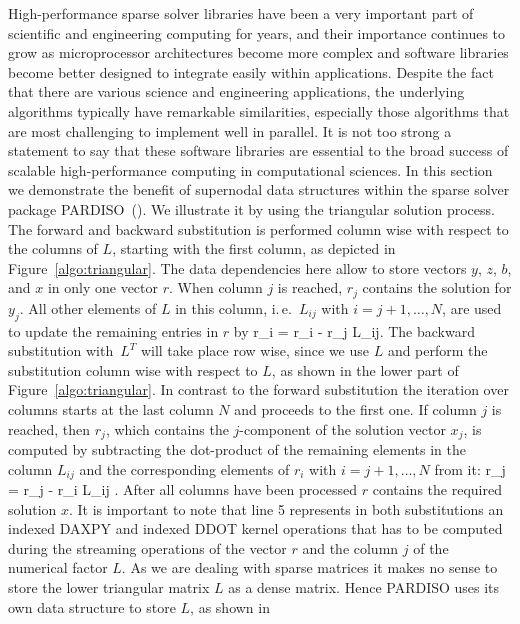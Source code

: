 High-performance sparse solver libraries have been a very important part of
scientific and engineering computing for years, and their importance
continues to grow as microprocessor architectures become more complex
and software libraries become better designed to integrate easily
within applications. Despite the fact that there are various science
and engineering applications, the underlying algorithms typically have
remarkable similarities, especially those algorithms that are most
challenging to implement well in parallel. It is not too strong a
statement to say that these software libraries are essential to the
broad success of scalable high-performance computing in computational
sciences.  In this section we demonstrate the benefit of supernodal data structures within the 
sparse solver package PARDISO~(\cite{schenk-2004,Bollhofer2020}). We illustrate it by using
the triangular solution process. The forward and backward substitution is performed
column wise with respect to the columns of $L$, starting with the
first column, as depicted in Figure~\ref{algo:triangular}.
The data dependencies here allow to store vectors $y$, $z$, $b$, and $x$ in only one
vector $r$. When column $j$ is reached, $r_j$ contains the solution for $y_j$. 
All other elements of $L$ in this column, i.\,e.\ $L_{ij}$ with $i = j + 1,
\ldots, N$, are used to update the remaining entries in $r$ by 
%
\be
  r_i = r_i - r_j L_{ij}.
  \label{eq:algo:fw:pardiso}
\ee
%
The backward substitution with~$L^T$ will take place row wise, since we
use $L$ and perform the substitution column wise with respect to $L$, as shown in the lower part of
Figure~\ref{algo:triangular}.  In contrast to the forward substitution the
iteration over columns starts at the last column $N$ and proceeds to
the first one.  If column $j$ is reached, then $r_j$, which contains the $j$-component of the solution vector $x_j$,
is computed by subtracting the dot-product of the remaining elements in
the column $L_{ij}$ and the corresponding elements of $r_i$ with $i =
j + 1, \ldots, N$ from it:
%
\be
  r_j = r_j - r_i L_{ij} .
  \label{eq:algo:bw:pardiso}
\ee
%
After all columns have been processed $r$ contains the required solution $x$. It is important to note that
line 5 represents in both substitutions an indexed DAXPY and indexed
DDOT kernel operations that has to be computed during the streaming 
operations of the vector $r$ and the column $j$ of the numerical factor $L$. 
As we are dealing with sparse matrices it makes no sense to store the lower
triangular matrix $L$ as a dense matrix.
Hence PARDISO uses its own data structure to store $L$, as shown in
